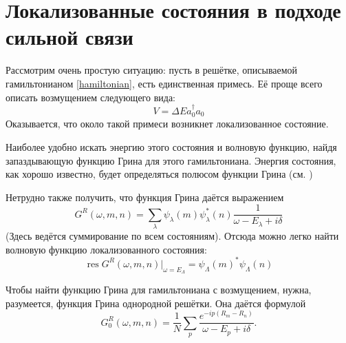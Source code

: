 \section{Локализованные состояния в подходе сильной связи}
Рассмотрим очень простую ситуацию: пусть в решётке, описываемой
гамильтонианом \eqref{hamiltonian}, есть единственная примесь. Её проще всего описать 
возмущением следующего вида:
\begin{equation}
	\label{pert}
	V = \Delta E a_0^{\dagger} a_0
\end{equation}
Оказывается, что около такой примеси возникнет локализованное состояние. 

Наиболее удобно искать энергию этого состояния и волновую функцию, найдя 
запаздывающую функцию Грина для этого гамильтониана. Энергия состояния, как хорошо 
известно, будет определяться полюсом функции Грина (см. \cite{Abrikosov})


Нетрудно также получить, что функция Грина даётся выражением
\begin{equation}
	\label{general}
	G^R(\omega, m,n) = \sum_\lambda \psi_\lambda(m)\psi_\lambda^{*}(n) 
			\frac{1}{\omega - E_\lambda + i\delta}
\end{equation}
(Здесь ведётся суммирование по всем состояниям). Отсюда можно легко найти волновую функцию
локализованного состояния:
\begin{equation}
	\label{res}
	\operatorname{\mathrm{res}} G^R(\omega, m,n) |_{\omega = E_\Lambda} = 
		\psi_{\Lambda}(m)^{*}\psi_{\Lambda}(n)
\end{equation}

Чтобы найти функцию Грина для гамильтониана с возмущением, нужна, разумеется, 
функция Грина однородной решётки. Она даётся формулой
\begin{equation}
	G_0^R(\omega,m,n) = 
			\frac{1}{N}\sum_p \frac{e^{-ip(R_m - R_n)}}{\omega - E_p + i\delta}.
\end{equation}

